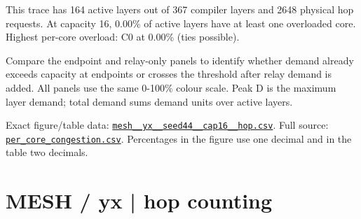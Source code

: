 \documentclass[10pt,a4paper]{article}
\begin{document}
This trace has 164 active layers out of 367 compiler layers and 2648 physical hop requests. At capacity 16, 0.00\% of active layers have at least one overloaded core. Highest per-core overload: C0 at 0.00\% (ties possible).\par
Compare the endpoint and relay-only panels to identify whether demand already exceeds capacity at endpoints or crosses the threshold after relay demand is added. All panels use the same 0-100\% colour scale. Peak D is the maximum layer demand; total demand sums demand units over active layers.\par
Exact figure/table data: \href{\detokenize{file:///home/dhruv-pansuriya/Documents/BTP/Compiler-Driven-ACE/output/pdf/qaoa_methods_congestion/tables/mesh__yx__seed44__cap16__hop.csv}}{\nolinkurl{mesh__yx__seed44__cap16__hop.csv}}. Full source: \href{\detokenize{file:///home/dhruv-pansuriya/Documents/BTP/Compiler-Driven-ACE/results/qaoa_2seed_2026-10-26/congestion/per_core_congestion.csv}}{\nolinkurl{per_core_congestion.csv}}. Percentages in the figure use one decimal and in the table two decimals.\par
\clearpage
\section*{MESH / yx | hop counting}
\end{document}
